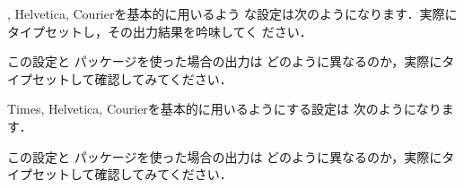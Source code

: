 \begin{Prob}
, Helvetica, Courierを基本的に用いるよう
な設定は次のようになります．実際にタイプセットし，その出力結果を吟味してく
ださい．

\begin{InTeX}
\usepackage{mathpazo}%
\usepackage[scaled]{helvet}%
\usepackage{courier}%
\end{InTeX} 

この設定と  パッケージを使った場合の出力は
どのように異なるのか，実際にタイプセットして確認してみてください．
\end{Prob}


\begin{Prob}
Times, Helvetica, Courierを基本的に用いるようにする設定は
次のようになります．
 
\begin{InTeX}
\usepackage{mathptmx}%
\usepackage[scaled]{helvet}%
\usepackage{courier}%
\end{InTeX}

この設定と  パッケージを使った場合の出力は
どのように異なるのか，実際にタイプセットして確認してみてください．

\end{Prob}



